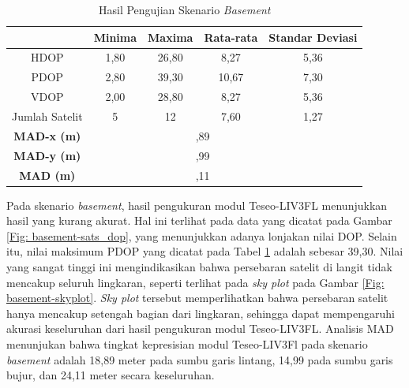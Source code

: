 \begin{table}[H]
	\caption{Hasil Pengujian Skenario \textit{Basement}}
	\vspace{0.5em}
	\centering
	\begin{tabular}{ccccc}
		\hline
		& \textbf{Minima} & \textbf{Maxima} & \textbf{Rata-rata} & \textbf{Standar Deviasi}\\
		\hline 
		HDOP & 1,80 & 26,80 & 8,27 & 5,36\\
		PDOP & 2,80 & 39,30 & 10,67 & 7,30\\
		VDOP & 2,00 & 28,80 & 8,27 & 5,36\\
		Jumlah Satelit & 5 & 12 & 7,60 & 1,27\\
		\hline
		\textbf{MAD-x (m)} & & \multicolumn{2}{c}{\centering 18,89} & \\
		\hline
		\textbf{MAD-y (m)} & & \multicolumn{2}{c}{\centering 14,99} & \\
		\hline
		\textbf{MAD (m)} & & \multicolumn{2}{c}{\centering 24,11} & \\
		\hline
	\end{tabular}
	\label{Tab: basement-table}
\end{table}

Pada skenario \textit{basement}, hasil pengukuran modul Teseo-LIV3FL menunjukkan hasil yang kurang akurat. Hal ini terlihat pada data yang dicatat pada Gambar \ref{Fig: basement-sats_dop}, yang menunjukkan adanya lonjakan nilai DOP. Selain itu, nilai maksimum PDOP yang dicatat pada Tabel \ref{Tab: basement-table} adalah sebesar 39,30. Nilai yang sangat tinggi ini mengindikasikan bahwa persebaran satelit di langit tidak mencakup seluruh lingkaran, seperti terlihat pada \textit{sky plot} pada Gambar \ref{Fig: basement-skyplot}. \textit{Sky plot} tersebut memperlihatkan bahwa persebaran satelit hanya mencakup setengah bagian dari lingkaran, sehingga dapat mempengaruhi akurasi keseluruhan dari hasil pengukuran modul Teseo-LIV3FL. Analisis MAD menunjukan bahwa tingkat kepresisian modul Teseo-LIV3Fl pada skenario \textit{basement} adalah 18,89 meter pada sumbu garis lintang, 14,99 pada sumbu garis bujur, dan 24,11 meter secara keseluruhan.

